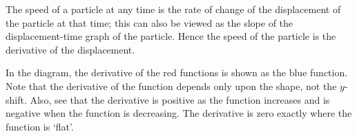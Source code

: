 \begin{ex}
  The speed of a particle at any time is the rate of change of the displacement of the particle at that time;
  this can also be viewed as the slope of the displacement-time graph of the particle. Hence the speed of the
  particle is the derivative of the displacement.
\end{ex}

\begin{ex}
  In the diagram, the derivative of the red functions is shown as the blue function. Note
  that the derivative of the function depends only upon the shape, not the $ y$-shift. Also,
  see that the derivative is positive as the function increases and is negative when the
  function is decreasing. The derivative is zero exactly where the function is `flat'.

  \begin{center}
  \end{center}
\end{ex}

\clearpage
